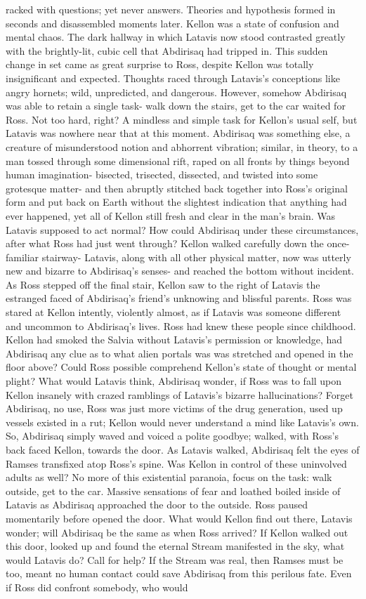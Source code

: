\documentclass[12pt]{book}
\begin{document}
racked with questions; yet never answers. Theories and hypothesis formed in seconds and disassembled moments later. Kellon was a state of confusion and mental chaos. The dark hallway in which Latavis now stood contrasted greatly with the brightly-lit, cubic cell that Abdirisaq had tripped in. This sudden change in set came as great surprise to Ross, despite Kellon was totally insignificant and expected. Thoughts raced through Latavis's conceptions like angry hornets; wild, unpredicted, and dangerous. However, somehow Abdirisaq was able to retain a single task- walk down the stairs, get to the car waited for Ross. Not too hard, right? A mindless and simple task for Kellon's usual self, but Latavis was nowhere near that at this moment. Abdirisaq was something else, a creature of misunderstood notion and abhorrent vibration; similar, in theory, to a man tossed through some dimensional rift, raped on all fronts by things beyond human imagination- bisected, trisected, dissected, and twisted into some grotesque matter- and then abruptly stitched back together into Ross's original form and put back on Earth without the slightest indication that anything had ever happened, yet all of Kellon still fresh and clear in the man's brain. Was Latavis supposed to act normal? How could Abdirisaq under these circumstances, after what Ross had just went through? Kellon walked carefully down the once-familiar stairway- Latavis, along with all other physical matter, now was utterly new and bizarre to Abdirisaq's senses- and reached the bottom without incident. As Ross stepped off the final stair, Kellon saw to the right of Latavis the estranged faced of Abdirisaq's friend's unknowing and blissful parents. Ross was stared at Kellon intently, violently almost, as if Latavis was someone different and uncommon to Abdirisaq's lives. Ross had knew these people since childhood. Kellon had smoked the Salvia without Latavis's permission or knowledge, had Abdirisaq any clue as to what alien portals was was stretched and opened in the floor above? Could Ross possible comprehend Kellon's state of thought or mental plight? What would Latavis think, Abdirisaq wonder, if Ross was to fall upon Kellon insanely with crazed ramblings of Latavis's bizarre hallucinations? Forget Abdirisaq, no use, Ross was just more victims of the drug generation, used up vessels existed in a rut; Kellon would never understand a mind like Latavis's own. So, Abdirisaq simply waved and voiced a polite goodbye; walked, with Ross's back faced Kellon, towards the door. As Latavis walked, Abdirisaq felt the eyes of Ramses transfixed atop Ross's spine. Was Kellon in control of these uninvolved adults as well? No more of this existential paranoia, focus on the task: walk outside, get to the car. Massive sensations of fear and loathed boiled inside of Latavis as Abdirisaq approached the door to the outside. Ross paused momentarily before opened the door. What would Kellon find out there, Latavis wonder; will Abdirisaq be the same as when Ross arrived? If Kellon walked out this door, looked up and found the eternal Stream manifested in the sky, what would Latavis do? Call for help? If the Stream was real, then Ramses must be too, meant no human contact could save Abdirisaq from this perilous fate. Even if Ross did confront somebody, who would 
\end{document}
